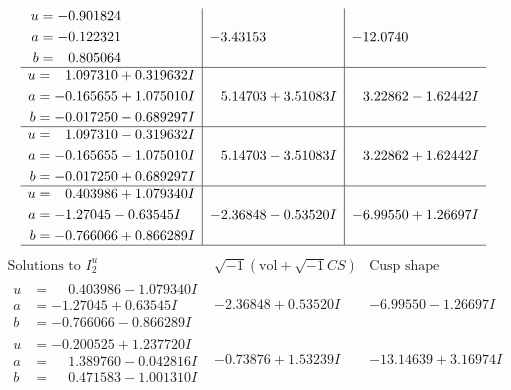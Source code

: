 \documentclass[1p]{elsarticle_modified}
\theoremstyle{definition}
\newcommand{\I}{\sqrt{-1}}
\begin{document}
$$\begin{array}{c|c|c}
\begin{aligned}
u &= -0.901824\phantom{ +0.000000I} \\
a &= -0.122321\phantom{ +0.000000I} \\
b &= \phantom{-}0.805064\phantom{ +0.000000I}\end{aligned}
 & -3.43153\phantom{ +0.000000I} & -12.0740\phantom{ +0.000000I} \\ \hline\begin{aligned}
u &= \phantom{-}1.097310 + 0.319632 I \\
a &= -0.165655 + 1.075010 I \\
b &= -0.017250 - 0.689297 I\end{aligned}
 & \phantom{-}5.14703 + 3.51083 I & \phantom{-}3.22862 - 1.62442 I \\ \hline\begin{aligned}
u &= \phantom{-}1.097310 - 0.319632 I \\
a &= -0.165655 - 1.075010 I \\
b &= -0.017250 + 0.689297 I\end{aligned}
 & \phantom{-}5.14703 - 3.51083 I & \phantom{-}3.22862 + 1.62442 I \\ \hline\begin{aligned}
u &= \phantom{-}0.403986 + 1.079340 I \\
a &= -1.27045 - 0.63545 I \\
b &= -0.766066 + 0.866289 I\end{aligned}
 & -2.36848 - 0.53520 I & -6.99550 + 1.26697 I\\
 \hline 
 \end{array}$$\newpage$$\begin{array}{c|c|c}  
\text{Solutions to }I^u_{2}& \I (\text{vol} + \sqrt{-1}CS) & \text{Cusp shape}\\
 \hline 
\begin{aligned}
u &= \phantom{-}0.403986 - 1.079340 I \\
a &= -1.27045 + 0.63545 I \\
b &= -0.766066 - 0.866289 I\end{aligned}
 & -2.36848 + 0.53520 I & -6.99550 - 1.26697 I \\ \hline\begin{aligned}
u &= -0.200525 + 1.237720 I \\
a &= \phantom{-}1.389760 - 0.042816 I \\
b &= \phantom{-}0.471583 - 1.001310 I\end{aligned}
 & -0.73876 + 1.53239 I & -13.14639 + 3.16974 I \\ \hline\begin{aligned}

\end{aligned}
\end{array}$$
\end{document}
